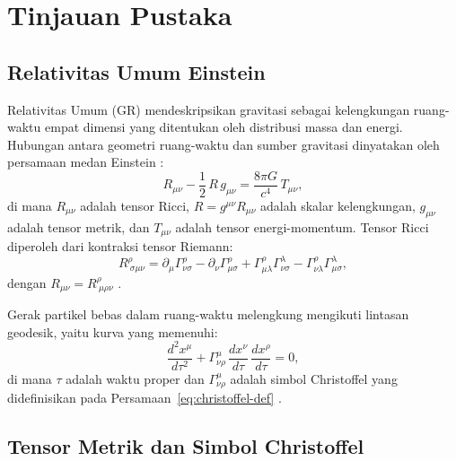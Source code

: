 
\chapter{Tinjauan Pustaka}
\label{chap:tinjauan}

\section{Relativitas Umum Einstein}
\label{sec:relativitas-umum}

Relativitas Umum (GR) mendeskripsikan gravitasi sebagai kelengkungan ruang-waktu empat dimensi yang ditentukan oleh distribusi massa dan energi. Hubungan antara geometri ruang-waktu dan sumber gravitasi dinyatakan oleh persamaan medan Einstein \parencite{Einstein1916GR}:
\begin{equation}
    R_{\mu\nu} - \frac{1}{2}\, R\, g_{\mu\nu} = \frac{8\pi G}{c^4}\, T_{\mu\nu},
    \label{eq:efe}
\end{equation}
di mana $R_{\mu\nu}$ adalah tensor Ricci, $R = g^{\mu\nu}R_{\mu\nu}$ adalah skalar kelengkungan, $g_{\mu\nu}$ adalah tensor metrik, dan $T_{\mu\nu}$ adalah tensor energi-momentum. Tensor Ricci diperoleh dari kontraksi tensor Riemann:
\begin{equation}
    R^\rho_{\ \sigma\mu\nu} = \partial_\mu \Gamma^\rho_{\nu\sigma}
    - \partial_\nu \Gamma^\rho_{\mu\sigma}
    + \Gamma^\rho_{\mu\lambda}\Gamma^\lambda_{\nu\sigma}
    - \Gamma^\rho_{\nu\lambda}\Gamma^\lambda_{\mu\sigma},
    \label{eq:riemann}
\end{equation}
dengan $R_{\mu\nu} = R^\rho_{\ \mu\rho\nu}$ \parencite{Carroll2004SpacetimeGeometry, Misner1973Gravitation}.

Gerak partikel bebas dalam ruang-waktu melengkung mengikuti lintasan geodesik, yaitu kurva yang memenuhi:
\begin{equation}
    \frac{d^2 x^\mu}{d\tau^2}
    + \Gamma^\mu_{\nu\rho}\,\frac{dx^\nu}{d\tau}\,\frac{dx^\rho}{d\tau} = 0,
    \label{eq:geodesic}
\end{equation}
di mana $\tau$ adalah waktu proper dan $\Gamma^\mu_{\nu\rho}$ adalah simbol Christoffel yang didefinisikan pada Persamaan~\eqref{eq:christoffel-def} \parencite{Schutz2009FirstCourse}.


\section{Tensor Metrik dan Simbol Christoffel}
\label{sec:metrik-christoffel}

